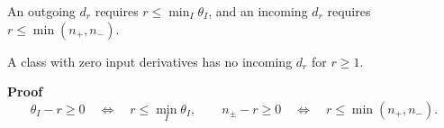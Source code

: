 \documentclass[11pt]{article}
\numberwithin{equation}{section}
\numberwithin{figure}{section}
\numberwithin{table}{section}
\begin{document}
An outgoing $d_r$ requires $r\le\min_I\theta_I$, and an incoming $d_r$ requires $r\le\min(n_+,n_-)$.

A class with zero input derivatives has no incoming $d_r$ for $r\ge1$.

\begin{proofbox}
\textbf{Proof}
\begin{equation*}
\theta_I-r\ge0\quad\Longleftrightarrow\quad r\le\min_I\theta_I,\qquad n_\pm-r\ge0\quad\Longleftrightarrow\quad r\le\min(n_+,n_-).
\end{equation*}

\par\vspace{-\medskipamount}\noindent\hspace*{\fill}\qedsymbol
\end{proofbox}
\end{document}
